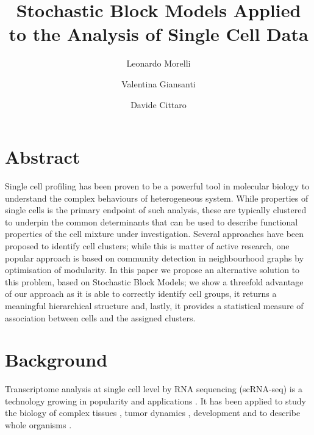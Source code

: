 \documentclass[10pt]{article}
\begin{document}
\title{Stochastic Block Models Applied to the Analysis of Single Cell Data}
\author[1,2]{Leonardo Morelli}
\author[1,3]{Valentina Giansanti}
\author[1]{Davide Cittaro}
\maketitle

\section*{Abstract}

Single cell profiling has been proven to be a powerful tool in molecular biology to understand the complex behaviours of heterogeneous system. While properties of single cells is the primary endpoint of such analysis, these are typically clustered to underpin the common determinants that can be used to describe functional properties of the cell mixture under investigation. Several approaches have been proposed to identify cell clusters; while this is matter of active research, one popular approach is based on community detection in neighbourhood graphs by optimisation of modularity. In this paper we propose an alternative solution to this problem, based on Stochastic Block Models; we show a threefold advantage of our approach as it is able to correctly identify cell groups, it returns a meaningful hierarchical structure and, lastly, it provides a statistical measure of association between cells and the assigned clusters.


\section*{Background}

Transcriptome analysis at single cell level by RNA sequencing (scRNA-seq) is a technology growing in popularity and applications \cite{svensson_2018}. It has been applied to study the biology of complex tissues \cite{guo_2018, ventotormo_2018}, tumor dynamics \cite{rozenblattrosen_2020, tirosh_2016, patel_2014, neftel_2019}, development \cite{rosenberg_2018, wagner_2018} and to describe whole organisms \cite{plass_2018, regev_2017}.
\end{document}
